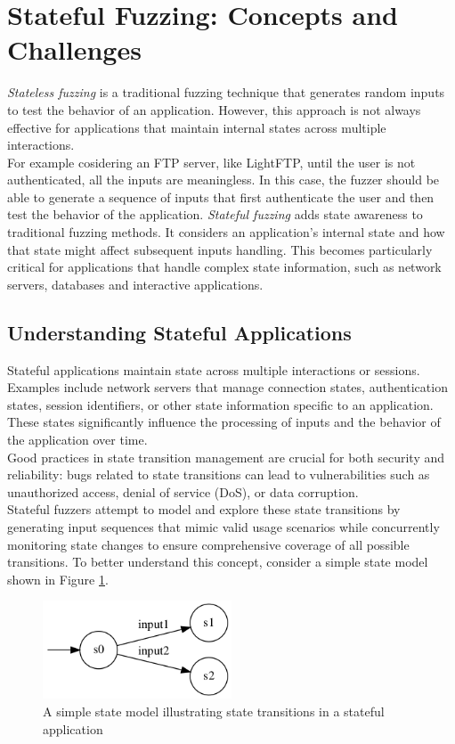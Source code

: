 \section{Stateful Fuzzing: Concepts and Challenges}
\textit{Stateless fuzzing} is a traditional fuzzing technique that generates random inputs to test the behavior of an application. However, this approach is not always effective for applications that maintain internal states across multiple interactions.
\\For example cosidering an FTP server, like LightFTP, until the user is not authenticated, all the inputs are meaningless. In this case, the fuzzer should be able to generate a sequence of inputs that first authenticate the user and then test the behavior of the application.
\textit{Stateful fuzzing} adds state awareness to traditional fuzzing methods. It considers an application's internal state and how that state might affect subsequent inputs handling. This becomes particularly critical for applications that handle complex state information, such as network servers, databases and interactive applications.

\subsection{Understanding Stateful Applications}
Stateful applications maintain state across multiple interactions or sessions. Examples include network servers that manage connection states, authentication states, session identifiers, or other state information specific to an application. These states significantly influence the processing of inputs and the behavior of the application over time.
\\Good practices in state transition management are crucial for both security and reliability: bugs related to state transitions can lead to vulnerabilities such as unauthorized access, denial of service (DoS), or data corruption. 
\\Stateful fuzzers attempt to model and explore these state transitions by generating input sequences that mimic valid usage scenarios while concurrently monitoring state changes to ensure comprehensive coverage of all possible transitions. To better understand this concept, consider a simple state model shown in Figure \ref{fig:simplestatemodel}.

\begin{figure}[h]
    \centering
    \includegraphics[width=0.5\textwidth]{Images/simplestatemodel.png}
    \caption{A simple state model illustrating state transitions in a stateful application}
    \label{fig:simplestatemodel}
\end{figure}


